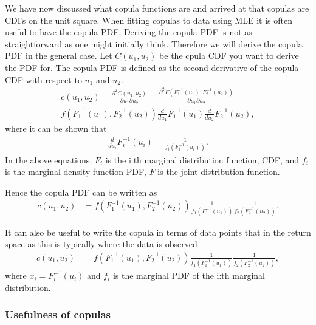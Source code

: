 We have now discussed what copula functions are and arrived at that copulas are \gls{CDF}s on the unit square. When fitting copulas to data using \gls{MLE} it is often useful to have the copula \gls{PDF}. Deriving the copula \gls{PDF} is not as straightforward as one might initially think. Therefore we will derive the copula \gls{PDF} in the general case. Let $C(u_1,u_2)$ be the cpula \gls{CDF} you want to derive the \gls{PDF} for. The copula \gls{PDF} is defined as the second derivative of the copula \gls{CDF} with respect to $u_1$ and $u_2$.
\begin{align*}
    c(u_1,u_2) = \frac{\partial^2C(u_1,u_2)}{\partial u_1\partial u_2} = 
    \frac{\partial^2F(F_1^{-1}(u_1),F_2^{-1}(u_2))}{\partial u_1\partial u_2}
    = \\ f(F_1^{-1}(u_1),F_2^{-1}(u_2)) \frac{d}{du_1} F_1^{-1}(u_1)  \frac{d}{du_2} F_2^{-1}(u_2),
\end{align*}
where it can be shown that 
\begin{align*}
    \frac{d}{du_i} F_i^{-1}(u_i) = \frac{1}{f_i(F_i^{-1}(u_i))}.
\end{align*}
In the above equations, $F_i$ is the i:th marginal distribution function, \gls{CDF}, and $f_i$ is the marginal density function \gls{PDF}, $F$ is the joint distribution function.   

Hence the copula \gls{PDF} can be written as 
\begin{align*}
    c(u_1,u_2) &= f(F_1^{-1}(u_1),F_2^{-1}(u_2)) \frac{1}{f_1(F_1^{-1}(u_1))}\frac{1}{f_2(F_2^{-1}(u_2))}. 
\end{align*}

It can also be useful to write the copula in terms of data points that in the return space as this is typically where the data is observed
\begin{align*}
    c(u_1,u_2) &= f(F_1^{-1}(u_1),F_2^{-1}(u_2)) \frac{1}{f_1(F_1^{-1}(u_1))}\frac{1}{f_2(F_2^{-1}(u_2))},
\end{align*}
where $x_i = F_i^{-1}(u_i)$ and $f_i$ is the marginal \gls{PDF} of the i:th marginal distribution. 



\subsubsection{Usefulness of copulas}

